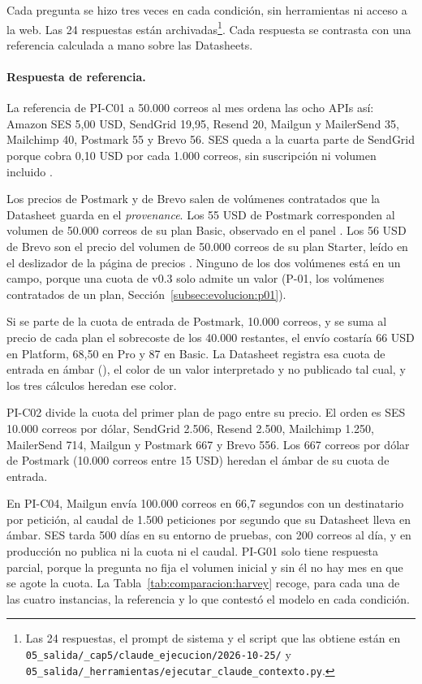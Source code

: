 Cada pregunta se hizo tres veces en cada condición, sin herramientas ni acceso a la web.
Las 24 respuestas están archivadas\footnote{Las 24 respuestas, el prompt de sistema y el script que las obtiene están en \texttt{05\_salida/\_cap5/claude\_ejecucion/2026-10-25/} y \texttt{05\_salida/\_herramientas/ejecutar\_claude\_contexto.py}.}.
Cada respuesta se contrasta con una referencia calculada a mano sobre las Datasheets.

\paragraph{Respuesta de referencia.}

La referencia de PI-C01 a 50.000 correos al mes ordena las ocho APIs así: Amazon SES 5,00 USD, SendGrid 19,95, Resend 20, Mailgun y MailerSend 35, Mailchimp 40, Postmark 55 y Brevo 56.
SES queda a la cuarta parte de SendGrid porque cobra 0,10 USD por cada 1.000 correos, sin suscripción ni volumen incluido \citep{sespricing}.

Los precios de Postmark y de Brevo salen de volúmenes contratados que la Datasheet guarda en el \textit{provenance}.
Los 55 USD de Postmark corresponden al volumen de 50.000 correos de su plan Basic, observado en el panel \citep{postmarkpricing}.
Los 56 USD de Brevo son el precio del volumen de 50.000 correos de su plan Starter, leído en el deslizador de la página de precios \citep{brevopricing}.
Ninguno de los dos volúmenes está en un campo, porque una cuota de v0.3 solo admite un valor (P-01, los volúmenes contratados de un plan, Sección~\ref{subsec:evolucion:p01}).

Si se parte de la cuota de entrada de Postmark, 10.000 correos, y se suma al precio de cada plan el sobrecoste de los 40.000 restantes, el envío costaría 66 USD en Platform, 68,50 en Pro y 87 en Basic.
La Datasheet registra esa cuota de entrada en ámbar (\semambar{}), el color de un valor interpretado y no publicado tal cual, y los tres cálculos heredan ese color.

PI-C02 divide la cuota del primer plan de pago entre su precio.
El orden es SES 10.000 correos por dólar, SendGrid 2.506, Resend 2.500, Mailchimp 1.250, MailerSend 714, Mailgun y Postmark 667 y Brevo 556.
Los 667 correos por dólar de Postmark (10.000 correos entre 15 USD) heredan el ámbar de su cuota de entrada.

En PI-C04, Mailgun envía 100.000 correos en 66,7 segundos con un destinatario por petición, al caudal de 1.500 peticiones por segundo que su Datasheet lleva en ámbar.
SES tarda 500 días en su entorno de pruebas, con 200 correos al día, y en producción no publica ni la cuota ni el caudal.
PI-G01 solo tiene respuesta parcial, porque la pregunta no fija el volumen inicial y sin él no hay mes en que se agote la cuota.
La Tabla~\ref{tab:comparacion:harvey} recoge, para cada una de las cuatro instancias, la referencia y lo que contestó el modelo en cada condición.

